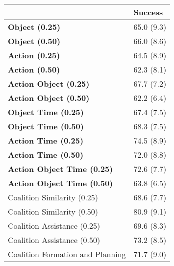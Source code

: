 \begin{tabular}{ll}
\hline
                                    & Success    \\
\hline
 \textbf{Object (0.25)}             & 65.0 (9.3) \\
 \textbf{Object (0.50)}             & 66.0 (8.6) \\
 \textbf{Action (0.25)}             & 64.5 (8.9) \\
 \textbf{Action (0.50)}             & 62.3 (8.1) \\
 \textbf{Action Object (0.25)}      & 67.7 (7.2) \\
 \textbf{Action Object (0.50)}      & 62.2 (6.4) \\
 \textbf{Object Time (0.25)}        & 67.4 (7.5) \\
 \textbf{Object Time (0.50)}        & 68.3 (7.5) \\
 \textbf{Action Time (0.25)}        & 74.5 (8.9) \\
 \textbf{Action Time (0.50)}        & 72.0 (8.8) \\
 \textbf{Action Object Time (0.25)} & 72.6 (7.7) \\
 \textbf{Action Object Time (0.50)} & 63.8 (6.5) \\
 Coalition Similarity (0.25)        & 68.6 (7.7) \\
 Coalition Similarity (0.50)        & 80.9 (9.1) \\
 Coalition Assistance (0.25)        & 69.6 (8.3) \\
 Coalition Assistance (0.50)        & 73.2 (8.5) \\
 Coalition Formation and Planning   & 71.7 (9.0) \\
\hline
\end{tabular}
